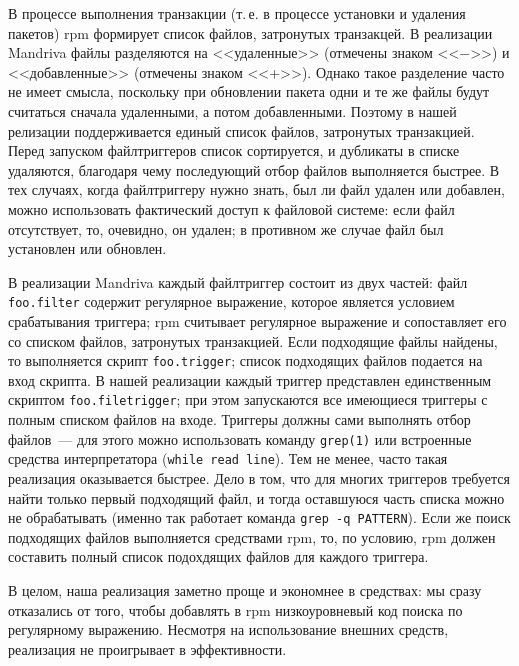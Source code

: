 \documentclass[russian,a4paper,12pt,titlepage]{article}
\begin{document}
В процессе выполнения транзакции (т.\,е. в процессе установки и удаления пакетов) rpm формирует список файлов, затронутых транзакцей.
В реализации Mandriva файлы разделяются на <<удаленные>> (отмечены знаком <<$-$>>) и <<добавленные>> (отмечены знаком <<+>>).
Однако такое разделение часто не имеет смысла, поскольку при обновлении пакета одни и те же файлы будут считаться сначала удаленными,
а потом добавленными.  Поэтому в нашей релизации поддерживается единый список файлов, затронутых транзакцией.  Перед запуском файлтриггеров
список сортируется, и дубликаты в списке удаляются, благодаря чему последующий отбор файлов выполняется быстрее.  В тех случаях,
когда файлтриггеру нужно знать, был ли файл удален или добавлен, можно использовать фактический доступ к файловой системе: если файл
отсутствует, то, очевидно, он удален; в противном же случае файл был установлен или обновлен.

В реализации Mandriva каждый файлтриггер состоит из двух частей: файл \verb|foo.filter| содержит регулярное выражение, которое является
условием срабатывания триггера; rpm считывает регулярное выражение и сопоставляет его со списком файлов, затронутых транзакцией.
Если подходящие файлы найдены, то выполняется скрипт \verb|foo.trigger|; список подходящих файлов подается на вход скрипта.
В нашей реализации каждый триггер представлен единственным скриптом \verb|foo.filetrigger|; при этом запускаются все имеющиеся триггеры
с полным списком файлов на входе.  Триггеры должны сами выполнять
отбор файлов~--- для этого можно использовать команду \verb|grep(1)| или встроенные средства интерпретатора (\texttt{while read line}).
Тем не менее, часто такая реализация оказывается быстрее.  Дело в том, что для многих триггеров требуется найти только
первый подходящий файл, и тогда оставшуюся часть списка можно не обрабатывать (именно так работает команда \verb|grep -q PATTERN|).
Если же поиск подходящих файлов выполняется средствами rpm, то, по условию, rpm должен составить полный список подохдящих
файлов для каждого триггера.

В целом, наша реализация заметно проще и экономнее в средствах: мы сразу отказались от того, чтобы добавлять в rpm низкоуровневый
код поиска по регулярному выражению.  Несмотря на использование внешних средств, реализация не проигрывает в эффективности.
\end{document}

